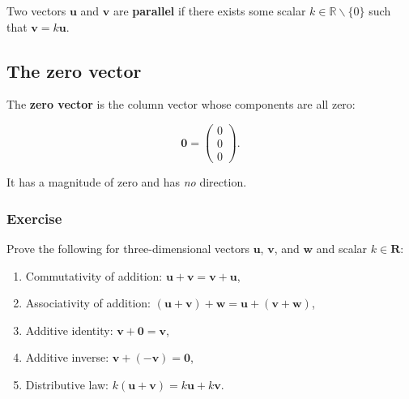 \documentclass[a4paper,12pt]{amsart}
\begin{document}
    Two vectors $\mathbf{u}$ and $\mathbf{v}$ are \textbf{parallel} if there exists some scalar $k \in \mathbb{R} \backslash \{ 0 \}$ such that $\mathbf{v} = k \mathbf{u}$.

    \subsection{The zero vector}

    The \textbf{zero vector} is the column vector whose components are all zero:

    \[ \mathbf{0} = \begin{pmatrix} 0 \\ 0 \\ 0 \end{pmatrix}. \]

    It has a magnitude of zero and has \emph{no} direction.

    \subsubsection{Exercise}

    Prove the following for three-dimensional vectors $\mathbf{u}$, $\mathbf{v}$, and $\mathbf{w}$ and scalar $k \in \mathbf{R}$:

    \begin{enumerate}
        \item Commutativity of addition: $\mathbf{u} + \mathbf{v} = \mathbf{v} + \mathbf{u}$,
        \item Associativity of addition: $(\mathbf{u} + \mathbf{v}) + \mathbf{w} = \mathbf{u} + (\mathbf{v} + \mathbf{w})$,
        \item Additive identity: $\mathbf{v} + \mathbf{0} = \mathbf{v}$,
        \item Additive inverse: $\mathbf{v} + (-\mathbf{v}) = \mathbf{0}$,
        \item Distributive law: $k (\mathbf{u} + \mathbf{v}) = k \mathbf{u} + k \mathbf{v}$.
    \end{enumerate}
\end{document}
